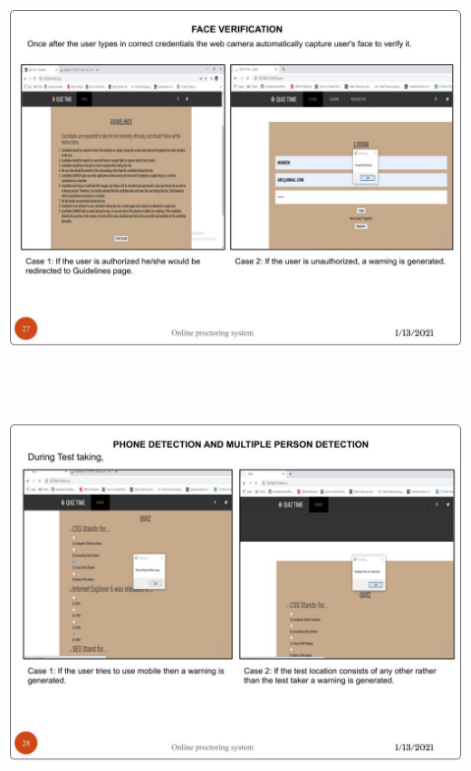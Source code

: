 \documentclass[12pt]{report}
\begin{document}
\includegraphics[width=17cm,height=12cm]{INTERNSHIP SAMPLE PRESENTATION (26)}\\
\includegraphics[width=17cm,height=12cm]{INTERNSHIP SAMPLE PRESENTATION (27)}\\
\end{document}
